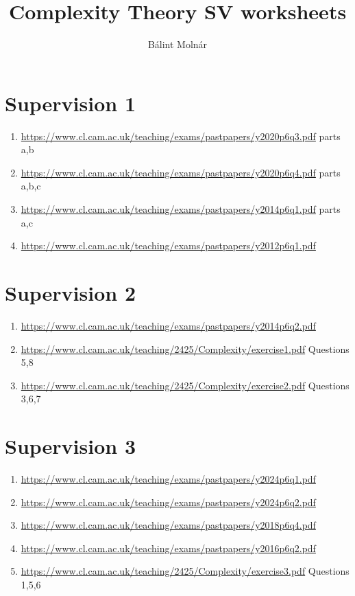\documentclass{article}
\title{{Complexity Theory SV worksheets}}
\author{Bálint Molnár}
\begin{document}
\maketitle
 
\section*{Supervision 1}

\begin{enumerate}
\item \url{https://www.cl.cam.ac.uk/teaching/exams/pastpapers/y2020p6q3.pdf} parts a,b
\item \url{https://www.cl.cam.ac.uk/teaching/exams/pastpapers/y2020p6q4.pdf} parts a,b,c
\item \url{https://www.cl.cam.ac.uk/teaching/exams/pastpapers/y2014p6q1.pdf} parts a,c
\item \url{https://www.cl.cam.ac.uk/teaching/exams/pastpapers/y2012p6q1.pdf}
   
\end{enumerate}

\section*{Supervision 2}
\begin{enumerate}
    \item \url{https://www.cl.cam.ac.uk/teaching/exams/pastpapers/y2014p6q2.pdf}
    \item \url{https://www.cl.cam.ac.uk/teaching/2425/Complexity/exercise1.pdf} Questions 5,8
   \item \url{https://www.cl.cam.ac.uk/teaching/2425/Complexity/exercise2.pdf} Questions 3,6,7
\end{enumerate}

\section*{Supervision 3}
\begin{enumerate}
    \item \url{https://www.cl.cam.ac.uk/teaching/exams/pastpapers/y2024p6q1.pdf}
    \item \url{https://www.cl.cam.ac.uk/teaching/exams/pastpapers/y2024p6q2.pdf}
    \item \url{https://www.cl.cam.ac.uk/teaching/exams/pastpapers/y2018p6q4.pdf}
    \item \url{https://www.cl.cam.ac.uk/teaching/exams/pastpapers/y2016p6q2.pdf}
    \item \url{https://www.cl.cam.ac.uk/teaching/2425/Complexity/exercise3.pdf} Questions 1,5,6
\end{enumerate}
\end{document}
